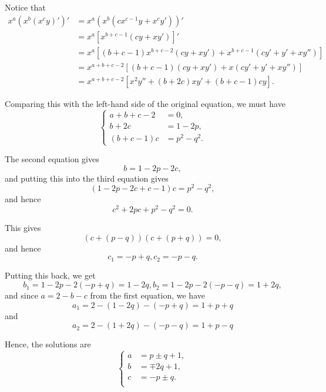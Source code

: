 \Question{\currfilebase}

Notice that
\begin{align*}
    x^a (x^b (x^c y)' )' & = x^a (x^b (c x^{c - 1} y + x^c y'))'                                                                             \\
                         & = x^a \left[x^{b + c - 1} \left(cy + xy' \right)\right]'                                                          \\
                         & = x^a \left[(b + c - 1) x^{b + c - 2} \left(cy + xy' \right) + x^{b + c - 1}  \left(cy' + y' + xy''\right)\right] \\
                         & = x^{a + b + c - 2} \left[(b + c - 1) \left(cy + xy' \right) + x \left(cy' + y' + xy''\right)\right]              \\
                         & = x^{a + b + c - 2} \left[x^2 y'' + (b + 2c) xy' + (b + c - 1) cy\right].
\end{align*}

Comparing this with the left-hand side of the original equation, we must have
\[
    \left\{
    \begin{aligned}
        a + b + c - 2 & = 0,         \\
        b + 2c        & = 1 - 2p,    \\
        (b + c - 1)c  & = p^2 - q^2.
    \end{aligned}
    \right.
\]

The second equation gives
\[
    b = 1 - 2p - 2c,
\]
and putting this into the third equation gives
\[
    (1 - 2p - 2c + c - 1)c = p^2 - q^2,
\]
and hence
\[
    c^2 + 2pc + p^2 - q^2 = 0.
\]

This gives
\[
    (c + (p - q))(c + (p + q)) = 0,
\]
and hence
\[
    c_1 = -p + q, c_2 = -p - q.
\]

Putting this back, we get
\[
    b_1 = 1 - 2p - 2(-p + q) = 1 - 2q, b_2 = 1 - 2p - 2(-p - q) = 1 + 2q,
\]
and since \(a = 2 - b - c\) from the first equation, we have
\[
    a_1 = 2 - (1 - 2q) - (-p + q) = 1 + p + q
\]
and
\[
    a_2 = 2 - (1 + 2q) - (-p - q) = 1 + p - q
\]

Hence, the solutions are
\[
    \left\{
    \begin{aligned}
        a & = p \pm q + 1, \\
        b & = \mp 2q + 1,  \\
        c & = -p \pm q.    \\
    \end{aligned}
    \right.
\]

